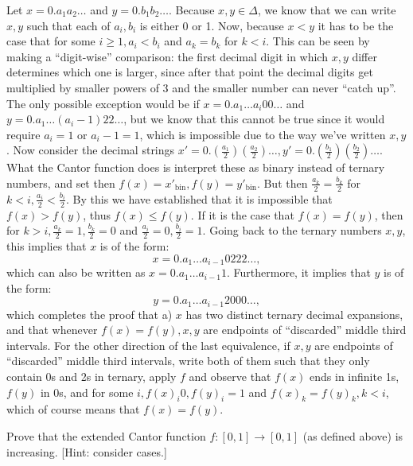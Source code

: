 \begin{solution}
    
    Let $x = 0.a_1 a_2 \ldots$ and $y = 0.b_1 b_2 \ldots$.
    Because $x, y \in \Delta$, we know that we can write $x, y$ such that each of $a_i, b_i$ is either 0 or 1.
    Now, because $x < y$ it has to be the case that for some $i \geq 1, a_i < b_i$ and $a_k = b_k$ for $k < i$.
    This can be seen by making a ``digit-wise'' comparison: the first decimal digit in which $x, y$ differ determines which one is larger, since after that point the decimal digits get multiplied by smaller powers of 3 and the smaller number can never ``catch up''.
    The only possible exception would be if $x = 0.a_1 \ldots a_i 0 0 \ldots$ and $y = 0.a_1 \ldots (a_i - 1) 2 2 \ldots$, but we know that this cannot be true since it would require $a_i = 1$ or $a_i - 1 = 1$, which is impossible due to the way we've written $x, y$.
    Now consider the decimal strings $x' = 0.(\frac{a_1}{2}) (\frac{a_2}{2}) \ldots, y' = 0.(\frac{b_1}{2}) ( \frac{b_2}{2}) \ldots$.
    What the Cantor function does is interpret these as binary instead of ternary numbers, and set then $f(x) = x'_{\text{bin}}, f(y) = y'_{\text{bin}}$.
    But then $\frac{a_k}{2} = \frac{b_k}{2}$ for $k < i, \frac{a_i}{2} < \frac{b_i}{2}$.
    By this we have established that it is impossible that $f(x) > f(y)$, thus $f(x) \leq f(y)$.
    If it is the case that $f(x) = f(y)$, then for $k > i, \frac{a_k}{2} = 1, \frac{b_k}{2} = 0$ and $\frac{a_i}{2} = 0, \frac{b_i}{2} = 1$.
    Going back to the ternary numbers $x, y$, this implies that $x$ is of the form:
    $$x = 0.a_1 \ldots a_{i-1} 0 2 2 2 \ldots,$$
    which can also be written as $x = 0.a_1 \ldots a_{i-1} 1$.
    Furthermore, it implies that $y$ is of the form:
    $$y = 0.a_1 \ldots a_{i-1} 2 0 0 0 \ldots,$$
    which completes the proof that a) $x$ has two distinct ternary decimal expansions, and that whenever $f(x) = f(y), x, y$ are endpoints of ``discarded'' middle third intervals.
    For the other direction of the last equivalence, if $x, y$ are endpoints of ``discarded'' middle third intervals, write both of them such that they only contain 0s and 2s in ternary, apply $f$ and observe that $f(x)$ ends in infinite 1s, $f(y)$ in 0s, and for some $i, f(x)_i 0, f(y)_i = 1$ and $f(x)_k = f(y)_k, k < i$, which of course means that $f(x) = f(y)$.
\end{solution}
\begin{exercise}{29}
    Prove that the extended Cantor function $f: [0, 1] \rightarrow [0, 1]$ (as defined above) is increasing. [Hint: consider cases.]
\end{exercise}

